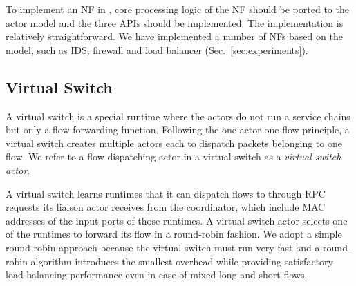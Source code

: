 



To implement an NF in \nfactor, core processing logic of the NF should be ported to the actor model and the three APIs should be implemented. The implementation is relatively straightforward. We have implemented a number of NFs based on the model, such as IDS, firewall and load balancer (Sec.~\ref{sec:experiments}).


\subsection{Virtual Switch}
\label{sec:virtualswitch}

A virtual switch is a special runtime where the actors do not run a service chains but only a flow forwarding function. Following the one-actor-one-flow principle, a virtual switch creates multiple actors each to dispatch packets belonging to one flow. We refer to a flow dispatching actor in a virtual switch as a {\em virtual switch actor}.


A virtual switch learns runtimes that it can dispatch flows to through RPC requests its liaison actor receives from the coordinator, which include MAC addresses of the input ports of those runtimes. A virtual switch actor selects one of the runtimes to forward its flow in a round-robin fashion. We adopt a simple round-robin approach because the virtual switch must run very fast and a round-robin algorithm introduces the smallest overhead while providing satisfactory load balancing performance even in case of mixed long and short flows.

